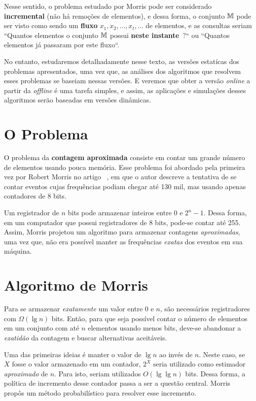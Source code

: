 Nesse sentido, o problema estudado por Morris pode ser considerado \textbf{incremental} (não há remoções de elementos), 
e dessa forma, o conjunto $\mathbb{M}$ pode ser visto como sendo um \textbf{fluxo} $x_1, x_2, \dots, x_t, \dots$ de elementos, 
e as consultas seriam ``Quantos elementos o conjunto $\mathbb{M}$ possui \textbf{neste instante}~$?$`` ou 
``Quantos elementos já passaram por este fluxo``.

No entanto, estudaremos detalhadamente nesse texto, as versões estatícas dos problemas apresentados, uma vez que, as 
análises dos algoritmos que resolvem esses problemas se baseiam nessas versões. E veremos que obter a versão 
\textit{online} a partir da \textit{offline} é uma tarefa simples, e assim, as aplicações e simulações desses algoritmos 
serão baseadas em versões dinâmicas.

\section{O Problema}

O problema da \textbf{contagem aproximada} consiste em contar um grande número de elementos usando pouca memória.  
Esse problema foi abordado pela primeira vez por Robert  Morris no artigo ~\citep{morris:78}, 
em que o autor descreve a tentativa de se contar eventos cujas frequências podiam chegar até 130 mil, mas usando apenas contadores de 8 bits.

Um registrador de $n$ bits pode armazenar inteiros entre $0$ e $2^n-1$. 
Dessa forma, em um computador que possui registradores de 8 bits, pode-se contar até 255.
Assim, Morris projetou um algoritmo para armazenar contagens \textit{aproximadas}, 
uma vez que, não era possível manter as frequências \textit{exatas} dos eventos em sua máquina.

\section{Algoritmo de Morris}

Para se armazenar \textit{exatamente} um valor entre $0$ e $n$, são necessários registradores com $\Omega(\lg n)$ bits. 
Então, para que seja possível contar o número de elementos em um conjunto com até $n$ elementos usando menos bits, 
deve-se abandonar a \textit{exatidão} da contagem e buscar alternativas aceitáveis.

Uma das primeiras ideias é manter o valor de $\lg n$ ao invés de $n$. 
Neste caso, se $X$ fosse o valor armazenado em um contador, $2^X$ seria utilizado como estimador \textit{aproximado} de $n$.
Para isto, seriam utilizados $O(\lg \lg n)$ bits.
Dessa forma, a política de incremento desse contador passa a ser a questão central.
Morris propôs um método probabilístico para resolver esse incremento.

